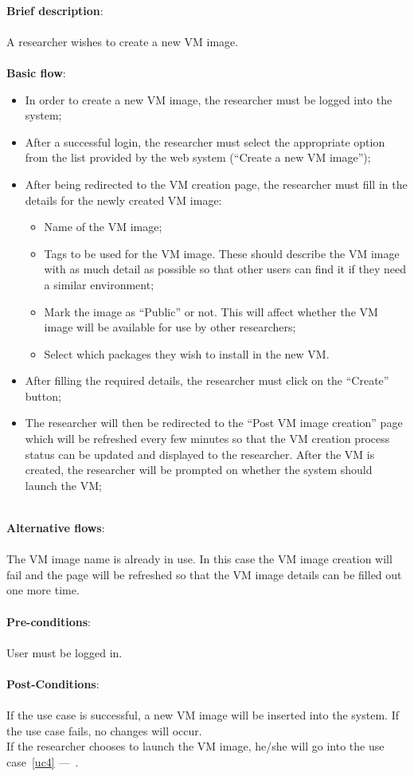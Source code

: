 \ \\
\textbf{Brief description}:\\
\ \\
A researcher wishes to create a new VM image.\\
\ \\
\textbf{Basic flow}:

\begin{itemize}
\item In order to create a new VM image, the researcher must be logged into the system;
\item After a successful login, the researcher must select the appropriate option from the list provided by the web system (``Create a new VM image'');
\item After being redirected to the VM creation page, the researcher must fill in the details for the newly created VM image:
	\begin{itemize}
	\item Name of the VM image;
	\item Tags to be used for the VM image. These should describe the VM image with as much detail as possible so that other users can find it if they need a similar environment;
	\item Mark the image as ``Public'' or not. This will affect whether the VM image will be available for use by other researchers;
	\item Select which packages they wish to install in the new VM.
	\end{itemize}
\item After filling the required details, the researcher must click on the ``Create'' button;
\item The researcher will then be redirected to the ``Post VM image creation'' page which will be refreshed every few minutes so that the VM creation process status can be updated and displayed to the researcher. After the VM is created, the researcher will be prompted on whether the system should launch the VM;
\end{itemize}

\ \\
\textbf{Alternative flows}:\\
\ \\
The VM image name is already in use. In this case the VM image creation will fail and the page will be refreshed so that the VM image details can be filled out one more time.\\
\ \\
\textbf{Pre-conditions}:\\
\ \\
User must be logged in.\\
\ \\
\textbf{Post-Conditions}:\\
\ \\
If the use case is successful, a new VM image will be inserted into the system. If the use case fails, no changes will occur.\\
If the researcher chooses to launch the VM image, he/she will go into the use case~\ref{uc4} ---~.\\

